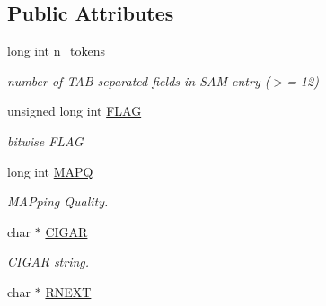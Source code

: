 \subsection*{Public Attributes}
\begin{DoxyCompactItemize}
\item 
\hypertarget{classGenomicRegionSAM_a281e35ef1bd0b7da811d9b8957f3d08f}{
long int \hyperlink{classGenomicRegionSAM_a281e35ef1bd0b7da811d9b8957f3d08f}{n\_\-tokens}}
\label{classGenomicRegionSAM_a281e35ef1bd0b7da811d9b8957f3d08f}

\begin{DoxyCompactList}\small\item\em number of TAB-\/separated fields in SAM entry ($>$= 12) \end{DoxyCompactList}\item 
\hypertarget{classGenomicRegionSAM_a200d7f7044dd69311eceb851a3c315e5}{
unsigned long int \hyperlink{classGenomicRegionSAM_a200d7f7044dd69311eceb851a3c315e5}{FLAG}}
\label{classGenomicRegionSAM_a200d7f7044dd69311eceb851a3c315e5}

\begin{DoxyCompactList}\small\item\em bitwise FLAG \end{DoxyCompactList}\item 
\hypertarget{classGenomicRegionSAM_aedacdd8319f4b614229a41b80d4c6f67}{
long int \hyperlink{classGenomicRegionSAM_aedacdd8319f4b614229a41b80d4c6f67}{MAPQ}}
\label{classGenomicRegionSAM_aedacdd8319f4b614229a41b80d4c6f67}

\begin{DoxyCompactList}\small\item\em MAPping Quality. \end{DoxyCompactList}\item 
\hypertarget{classGenomicRegionSAM_aa5acff481ae565db4976e66933212726}{
char $\ast$ \hyperlink{classGenomicRegionSAM_aa5acff481ae565db4976e66933212726}{CIGAR}}
\label{classGenomicRegionSAM_aa5acff481ae565db4976e66933212726}

\begin{DoxyCompactList}\small\item\em CIGAR string. \end{DoxyCompactList}\item 
\hypertarget{classGenomicRegionSAM_af723505bfafff1a1fa616479023d0c3c}{
char $\ast$ \hyperlink{classGenomicRegionSAM_af723505bfafff1a1fa616479023d0c3c}{RNEXT}}
\label{classGenomicRegionSAM_af723505bfafff1a1fa616479023d0c3c}


\end{DoxyCompactItemize}
